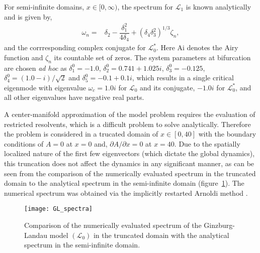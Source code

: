 For semi-infinite domains, $x\in[0,\infty)$, the spectrum for $\mathcal{L}_{1}$ is known analytically \citep{chomaz88} and is given by,
	\begin{align}
		\omega_{n}	=& \delta_{2} - \dfrac{\delta_{1}^{2}}{4\delta_{4}} + (\delta_{4}\delta_{3}^{2})^{1/3}\zeta_{n}, \label{eqn:eigenvalues} 
	\end{align}
and the corrresponding complex conjugate for $\mathcal{L}^{*}_{0}$. Here $\mathrm{Ai}$ denotes the Airy function and $\zeta_{n}$ its countable set of zeros.
 The system parameters at bifurcation are chosen \emph{ad hoc} as $\delta^{0}_{1} = -1.0$, $\delta^{0}_{2} = 0.741 + 1.025i$, $\delta^{0}_{3}=-0.125$, $\delta^{0}_{4}=(1.0 - i)/\sqrt{2}$ and $\delta^{0}_{5} =-0.1+0.1i$, which results in a single critical eigenmode with eigenvalue $\omega_{c} = 1.0i$ for $\mathcal{L}_{0}$ and its conjugate, $-1.0i$ for $\mathcal{L}^{*}_{0}$, and all other eigenvalues have negative real parts. 
 
 A center-manifold approximation of the model problem requires the evaluation of restricted resolvents, which is a difficult problem to solve analytically. Therefore the problem is considered in a trucated domain of $x\in [0,40]$ with the boundary conditions of $A = 0$ at $x=0$ and, $\partial A/\partial x = 0$ at $x=40$. Due to the spatially localized nature of the first few eigenvectors (which dictate the global dynamics), this truncation does not affect the dynamics in any significant manner, as can be seen from the comparison of the numerically evaluated spectrum in the truncated domain to the analytical spectrum in the semi-infinite domain (figure~\ref{fig:GL_spectrum}). The numerical spectrum was obtained via the implicitly restarted Arnoldi method \citep{sorensen92}.
\begin{figure}
	\centering
	\texttt{[image: GL\_spectra]}
	\caption{Comparison of the numerically evaluated spectrum of the Ginzburg-Landau model $(\mathcal{L}_{0})$ in the truncated domain with the analytical spectrum in the semi-infinite domain.}
	\label{fig:GL_spectrum}
\end{figure}


